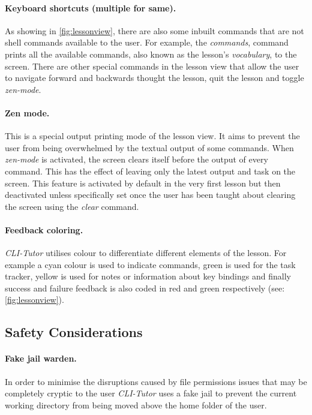 \paragraph{Keyboard shortcuts (multiple for same).}
As showing in \autoref{fig:lessonview}, there are also some inbuilt commands
that are not shell commands available to the user. For example, the
\textit{commands}, command prints all the available commands, also known as the
lesson's \textit{vocabulary}, to the screen. There are other special
commands in the lesson view that allow the user to navigate forward and
backwards thought the lesson, quit the lesson and toggle \textit{zen-mode}.

\paragraph{Zen mode.} This is a special output printing mode of the lesson
view. It aims to prevent the user from being overwhelmed by the textual output
of some commands. When \textit{zen-mode} is activated, the screen clears itself
before the output of every command. This has the effect of leaving only the
latest output and task on the screen. This feature is activated by default in
the very first lesson but then deactivated unless specifically set once the
user has been taught about clearing the screen using the \textit{clear}
command.

\paragraph{Feedback coloring.} \textit{CLI-Tutor} utilises colour to
differentiate different elements of the lesson. For example a cyan colour is
used to indicate commands, green is used for the task tracker, yellow is used
for notes or information about key bindings and finally success and failure
feedback is also coded in red and green respectively (see:
\autoref{fig:lessonview}).


\subsection{Safety Considerations}
\paragraph{Fake jail warden.}
In order to minimise the disruptions caused by file permissions issues that may
be completely cryptic to the user \textit{CLI-Tutor}  uses a fake jail to
prevent the current working directory from being moved above the home folder of
the user.

